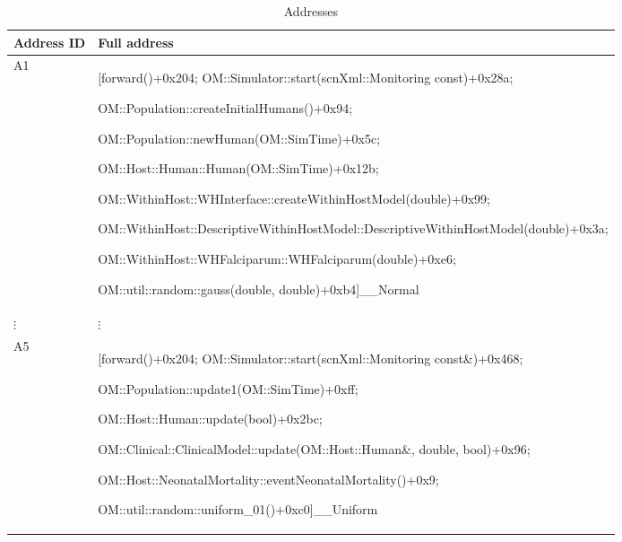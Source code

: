 \documentclass{article}
\begin{document}
  \begin{table}[h!]
  \footnotesize
  \setlength{\tabcolsep}{1mm}
  \caption{Addresses }
  \label{table:addresses}
  \def\arraystretch{1.25}
  \begin{tabularx}{\textwidth}{@{}lX@{}} 
    \toprule
    Address ID & Full address \\
    \midrule
  A1 & [forward()+0x204; OM::Simulator::start(scnXml::Monitoring const)+0x28a;

  OM::Population::createInitialHumans()+0x94;
  
  OM::Population::newHuman(OM::SimTime)+0x5c;

  OM::Host::Human::Human(OM::SimTime)+0x12b;

  OM::WithinHost::WHInterface::createWithinHostModel(double)+0x99;

  OM::WithinHost::DescriptiveWithinHostModel::DescriptiveWithinHostModel(double)+0x3a;

  OM::WithinHost::WHFalciparum::WHFalciparum(double)+0xe6;

  OM::util::random::gauss(double, double)+0xb4]\_\_Normal\\

   $\vdots$ & $\vdots$ \\
  A5 & [forward()+0x204; OM::Simulator::start(scnXml::Monitoring const\&)+0x468;

   OM::Population::update1(OM::SimTime)+0xff;

    OM::Host::Human::update(bool)+0x2bc;

    OM::Clinical::ClinicalModel::update(OM::Host::Human\&, double, bool)+0x96;

    OM::Host::NeonatalMortality::eventNeonatalMortality()+0x9;

    OM::util::random::uniform\_01()+0xc0]\_\_Uniform\\






\end{tabularx}
\end{table}
\end{document}
